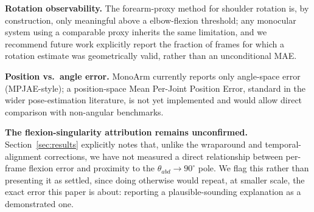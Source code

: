 \documentclass[conference]{IEEEtran}
\begin{document}
\textbf{Rotation observability.} The forearm-proxy method for shoulder
rotation is, by construction, only meaningful above a elbow-flexion
threshold; any monocular system using a comparable proxy inherits the
same limitation, and we recommend future work explicitly report the
fraction of frames for which a rotation estimate was geometrically
valid, rather than an unconditional MAE.

\textbf{Position vs.\ angle error.} MonoArm currently reports only
angle-space error (MPJAE-style); a position-space Mean Per-Joint
Position Error, standard in the wider pose-estimation literature, is not
yet implemented and would allow direct comparison with non-angular
benchmarks.

\textbf{The flexion-singularity attribution remains unconfirmed.}
Section~\ref{sec:results} explicitly notes that, unlike the wraparound
and temporal-alignment corrections, we have not measured a direct
relationship between per-frame flexion error and proximity to the
$\theta_{abd}\to90^\circ$ pole. We flag this rather than presenting it as
settled, since doing otherwise would repeat, at smaller scale, the exact
error this paper is about: reporting a plausible-sounding explanation as
a demonstrated one.
\end{document}
